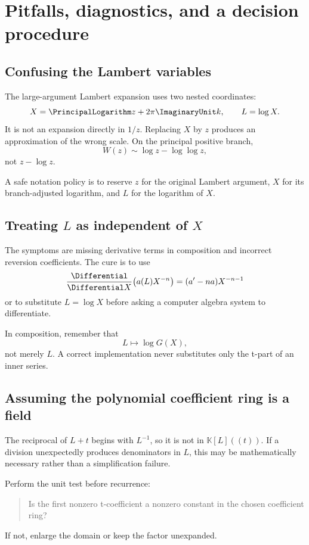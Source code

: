 \documentclass[11pt,openany]{book}
\theoremstyle{definition}
\theoremstyle{plain}
\theoremstyle{remark}
\newcommand{\K}{\mathbb{K}}
\begin{document}
\chapter{Pitfalls, diagnostics, and a decision procedure}\label{ch:pitfalls}

\section{Confusing the Lambert variables}
The large-argument Lambert expansion uses two nested coordinates:
\[
 X=\PrincipalLogarithm z+2\pi\ImaginaryUnit k,
 \qquad
 L=\log X.
\]
It is not an expansion directly in \(1/z\).  Replacing \(X\) by \(z\) produces
an approximation of the wrong scale.  On the principal positive branch,
\[
 W(z)\sim\log z-\log\log z,
\]
not \(z-\log z\).

A safe notation policy is to reserve \(z\) for the original Lambert argument,
\(X\) for its branch-adjusted logarithm, and \(L\) for the logarithm of \(X\).

\section{Treating \texorpdfstring{\(L\)}{L} as independent of
\texorpdfstring{\(X\)}{X}}
The symptoms are missing derivative terms in composition and incorrect
reversion coefficients.  The cure is to use
\[
 \frac{\Differential}{\Differential X}\bigl(a(L)X^{-n}\bigr)
 =(a'-na)X^{-n-1}
\]
or to substitute \(L=\log X\) before asking a computer algebra system to
differentiate.

In composition, remember that
\[
 L\longmapsto\log G(X),
\]
not merely \(L\).  A correct implementation never substitutes only the t-part
of an inner series.

\section{Assuming the polynomial coefficient ring is a field}
The reciprocal of \(L+t\) begins with \(L^{-1}\), so it is not in
\(\K[L]((t))\).  If a division unexpectedly produces denominators in \(L\),
this may be mathematically necessary rather than a simplification failure.

Perform the unit test before recurrence:
\begin{quote}
Is the first nonzero t-coefficient a nonzero constant in the chosen coefficient
ring?
\end{quote}
If not, enlarge the domain or keep the factor unexpanded.
\end{document}

